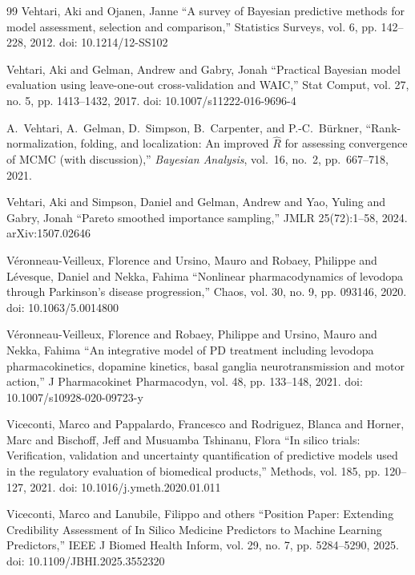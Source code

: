 \begin{thebibliography}{99}
 Vehtari, Aki and Ojanen, Janne ``A survey of Bayesian predictive methods for model assessment, selection and comparison,'' Statistics Surveys, vol. 6, pp. 142--228, 2012. doi: 10.1214/12-SS102

 Vehtari, Aki and Gelman, Andrew and Gabry, Jonah ``Practical Bayesian model evaluation using leave-one-out cross-validation and WAIC,'' Stat Comput, vol. 27, no. 5, pp. 1413--1432, 2017. doi: 10.1007/s11222-016-9696-4

A.~Vehtari, A.~Gelman, D.~Simpson, B.~Carpenter, and P.-C.~B{\"u}rkner, ``Rank-normalization, folding, and localization: An improved $\widehat{R}$ for assessing convergence of MCMC (with discussion),'' \textit{Bayesian Analysis}, vol.~16, no.~2, pp.~667--718, 2021.

 Vehtari, Aki and Simpson, Daniel and Gelman, Andrew and Yao, Yuling and Gabry, Jonah ``Pareto smoothed importance sampling,'' JMLR 25(72):1--58, 2024. arXiv:1507.02646

 V\'eronneau-Veilleux, Florence and Ursino, Mauro and Robaey, Philippe and L\'evesque, Daniel and Nekka, Fahima ``Nonlinear pharmacodynamics of levodopa through Parkinson's disease progression,'' Chaos, vol. 30, no. 9, pp. 093146, 2020. doi: 10.1063/5.0014800

 V\'eronneau-Veilleux, Florence and Robaey, Philippe and Ursino, Mauro and Nekka, Fahima ``An integrative model of PD treatment including levodopa pharmacokinetics, dopamine kinetics, basal ganglia neurotransmission and motor action,'' J Pharmacokinet Pharmacodyn, vol. 48, pp. 133--148, 2021. doi: 10.1007/s10928-020-09723-y

 Viceconti, Marco and Pappalardo, Francesco and Rodriguez, Blanca and Horner, Marc and Bischoff, Jeff and Musuamba Tshinanu, Flora ``In silico trials: Verification, validation and uncertainty quantification of predictive models used in the regulatory evaluation of biomedical products,'' Methods, vol. 185, pp. 120--127, 2021. doi: 10.1016/j.ymeth.2020.01.011

 Viceconti, Marco and Lanubile, Filippo and others ``Position Paper: Extending Credibility Assessment of In Silico Medicine Predictors to Machine Learning Predictors,'' IEEE J Biomed Health Inform, vol. 29, no. 7, pp. 5284--5290, 2025. doi: 10.1109/JBHI.2025.3552320


\end{thebibliography}
